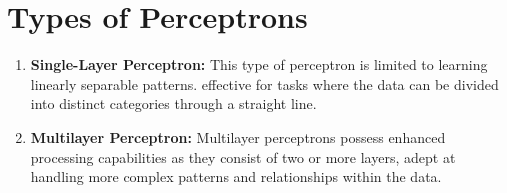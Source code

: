 \section{Types of Perceptrons}
    \begin{enumerate}
        \item \textbf{Single-Layer Perceptron:} This type of perceptron is limited to learning linearly separable patterns. effective for tasks where the data can be divided into distinct categories through a straight line.
        \item \textbf{Multilayer Perceptron:} Multilayer perceptrons possess enhanced processing capabilities as they consist of two or more layers, adept at handling more complex patterns and relationships within the data.
    \end{enumerate}